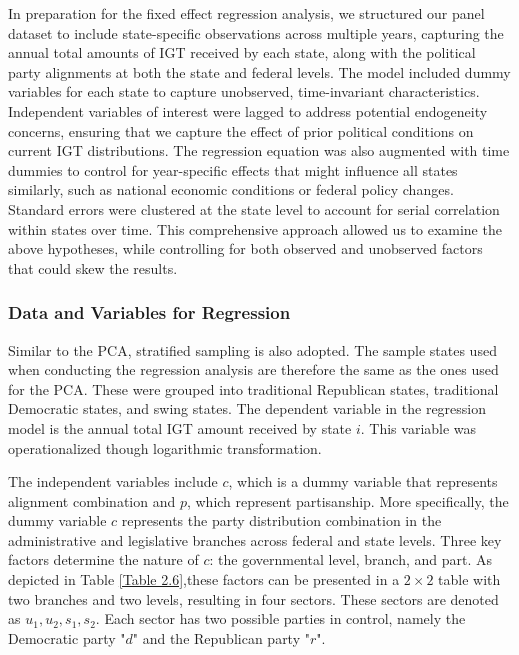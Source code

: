 In preparation for the fixed effect regression analysis, we structured our panel dataset to include state-specific observations across multiple years, capturing the annual total amounts of IGT received by each state, along with the political party alignments at both the state and federal levels.
The model included dummy variables for each state to capture unobserved, time-invariant characteristics. Independent variables of interest were lagged to address potential endogeneity concerns, ensuring that we capture the effect of prior political conditions on current IGT distributions. The regression equation was also augmented with time dummies to control for year-specific
effects that might influence all states similarly, such as national economic conditions or federal policy changes. Standard errors were clustered at the state level to account for serial correlation within states over time. This comprehensive approach allowed us to examine the above hypotheses, while controlling for both observed and unobserved factors that could skew the results.


\subsubsection{Data and Variables for Regression}

Similar to the PCA, stratified sampling is also adopted. The sample states used when conducting the regression analysis are therefore the same as the ones used for the PCA. These were grouped into traditional Republican states, traditional Democratic states, and swing states. The dependent variable in the regression model is the annual total IGT amount received by state $i$. This variable
was operationalized though logarithmic transformation.

The independent variables include $c$, which is a dummy variable that represents alignment combination and $p$, which represent partisanship. More specifically, the dummy variable $c$ represents the party distribution combination in the administrative and legislative branches across
federal and state levels. Three key factors determine the nature of $c$: the governmental level, branch, and part. As depicted in Table \ref{Table 2.6},these factors can be presented in a $2\times2$ table with two
branches and two levels, resulting in four sectors. These sectors are denoted as $u_1, u_2, s_1, s_2$. Each sector has two possible parties in control, namely the Democratic party "$d$" and the Republican party "$r$".

